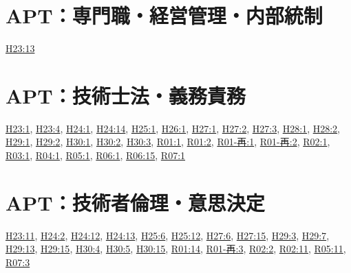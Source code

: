 \section{APT：専門職・経営管理・内部統制}
\hyperref[q:h23-reg-apt-13]{H23:13}
\section{APT：技術士法・義務責務}
\hyperref[q:h23-reg-apt-01]{H23:1}, \hyperref[q:h23-reg-apt-04]{H23:4}, \hyperref[q:h24-reg-apt-01]{H24:1}, \hyperref[q:h24-reg-apt-14]{H24:14}, \hyperref[q:h25-reg-apt-01]{H25:1}, \hyperref[q:h26-reg-apt-01]{H26:1}, \hyperref[q:h27-reg-apt-01]{H27:1}, \hyperref[q:h27-reg-apt-02]{H27:2}, \hyperref[q:h27-reg-apt-03]{H27:3}, \hyperref[q:h28-reg-apt-01]{H28:1}, \hyperref[q:h28-reg-apt-02]{H28:2}, \hyperref[q:h29-reg-apt-01]{H29:1}, \hyperref[q:h29-reg-apt-02]{H29:2}, \hyperref[q:h30-reg-apt-01]{H30:1}, \hyperref[q:h30-reg-apt-02]{H30:2}, \hyperref[q:h30-reg-apt-03]{H30:3}, \hyperref[q:r01-reg-apt-01]{R01:1}, \hyperref[q:r01-reg-apt-02]{R01:2}, \hyperref[q:r01-ret-apt-01]{R01-再:1}, \hyperref[q:r01-ret-apt-02]{R01-再:2}, \hyperref[q:r02-reg-apt-01]{R02:1}, \hyperref[q:r03-reg-apt-01]{R03:1}, \hyperref[q:r04-reg-apt-01]{R04:1}, \hyperref[q:r05-reg-apt-01]{R05:1}, \hyperref[q:r06-reg-apt-01]{R06:1}, \hyperref[q:r06-reg-apt-15]{R06:15}, \hyperref[q:r07-reg-apt-01]{R07:1}
\section{APT：技術者倫理・意思決定}
\hyperref[q:h23-reg-apt-11]{H23:11}, \hyperref[q:h24-reg-apt-02]{H24:2}, \hyperref[q:h24-reg-apt-12]{H24:12}, \hyperref[q:h24-reg-apt-13]{H24:13}, \hyperref[q:h25-reg-apt-06]{H25:6}, \hyperref[q:h25-reg-apt-12]{H25:12}, \hyperref[q:h27-reg-apt-06]{H27:6}, \hyperref[q:h27-reg-apt-15]{H27:15}, \hyperref[q:h29-reg-apt-03]{H29:3}, \hyperref[q:h29-reg-apt-07]{H29:7}, \hyperref[q:h29-reg-apt-13]{H29:13}, \hyperref[q:h29-reg-apt-15]{H29:15}, \hyperref[q:h30-reg-apt-04]{H30:4}, \hyperref[q:h30-reg-apt-05]{H30:5}, \hyperref[q:h30-reg-apt-15]{H30:15}, \hyperref[q:r01-reg-apt-14]{R01:14}, \hyperref[q:r01-ret-apt-03]{R01-再:3}, \hyperref[q:r02-reg-apt-02]{R02:2}, \hyperref[q:r02-reg-apt-11]{R02:11}, \hyperref[q:r05-reg-apt-11]{R05:11}, \hyperref[q:r07-reg-apt-03]{R07:3}
